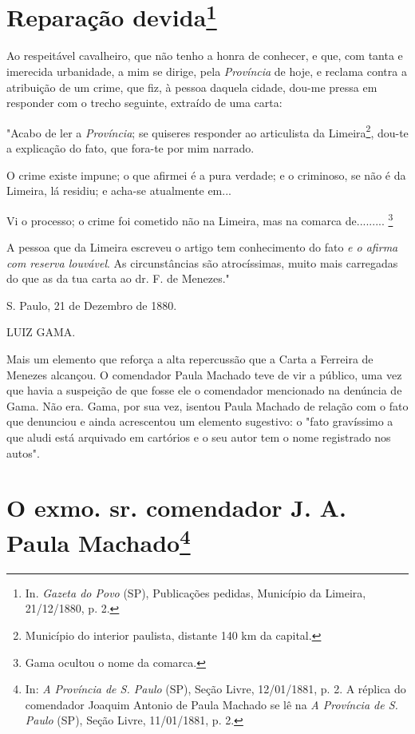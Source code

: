 {\chapter{Reparação devida\footnote[*]{In. \emph{Gazeta do Povo} (SP),
  Publicações pedidas, Município da Limeira, 21/12/1880, p. 2.}}


Ao respeitável cavalheiro, que não tenho a honra de conhecer, e que, com
tanta e imerecida urbanidade, a mim se dirige, pela \emph{Província} de
hoje, e reclama contra a atribuição de um crime, que fiz, à pessoa
daquela cidade, dou-me pressa em responder com o trecho seguinte,
extraído de uma carta:

\noindent\dotfill{}

"Acabo de ler a \emph{Província}; se quiseres responder ao articulista
da Limeira\footnote{Município do interior paulista, distante 140 km da
  capital.}, dou-te a explicação do fato, que fora-te por mim narrado.

O crime existe impune; o que afirmei é a pura verdade; e o criminoso, se
não é da Limeira, lá residiu; e acha-se atualmente em...

Vi o processo; o crime foi cometido não na Limeira, mas na comarca
de......... \footnote{Gama ocultou o nome da comarca.}

A pessoa que da Limeira
escreveu o artigo tem conhecimento do fato \emph{e o afirma com reserva
louvável}. As circunstâncias são atrocíssimas, muito mais carregadas do
que as da tua carta ao dr. F. de Menezes."

\dotfill{}

S. Paulo, 21 de Dezembro de 1880.

LUIZ GAMA.

\pagebreak
\mbox{}\vfill
\thispagestyle{empty}

{\small\noindent
Mais um elemento que reforça a alta repercussão que a Carta a
Ferreira de Menezes alcançou. O comendador Paula Machado teve de vir a
público, uma vez que havia a suspeição de que fosse ele o comendador
mencionado na denúncia de Gama. Não era. Gama, por sua vez, isentou
Paula Machado de relação com o fato que denunciou e ainda acrescentou um
elemento sugestivo: o "fato gravíssimo a que aludi está arquivado em
cartórios e o seu autor tem o nome registrado nos autos". }

\chapter{O exmo. sr. comendador J. A. Paula Machado\footnote[*]{In:
  \emph{A Província de S. Paulo} (SP), Seção Livre, 12/01/1881, p. 2. A
  réplica do comendador Joaquim Antonio de Paula Machado se lê na
  \emph{A Província de S. Paulo} (SP), Seção Livre, 11/01/1881, p. 2.}}


}
